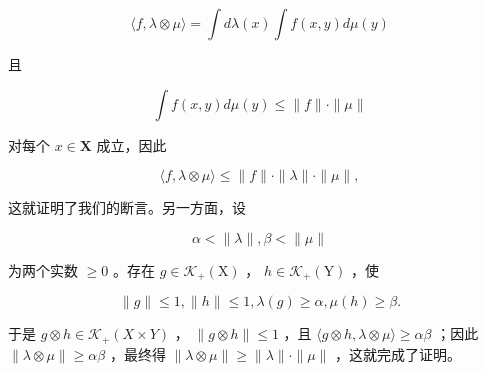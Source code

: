 \[
\langle f, \lambda \otimes \mu \rangle = \int d \lambda (x) \int f (x, y) d \mu (y)
\]

且

\[
\int f (x, y) d \mu (y) \leqslant \| f \| \cdot \| \mu \|
\]

对每个 \(x\in \mathbf{X}\) 成立，因此

\[
\langle f, \lambda \otimes \mu \rangle \leqslant \| f \| \cdot \| \lambda \| \cdot \| \mu \|,
\]

这就证明了我们的断言。另一方面，设

\[
\alpha <   \| \lambda \|, \beta <   \| \mu \|
\]

为两个实数 \(\geqslant 0\) 。存在 \(g\in \mathcal{K}_{+}(\mathrm{X})\) ， \(h\in \mathcal{K}_{+}(\mathrm{Y})\) ，使

\[
\| g \| \leqslant 1, \| h \| \leqslant 1, \lambda (g) \geqslant \alpha , \mu (h) \geqslant \beta .
\]

于是 \(g \otimes h \in \mathcal{K}_{+}(X \times Y)\) ， \(\| g \otimes h \| \leqslant 1\) ，且 \(\langle g \otimes h, \lambda \otimes \mu \rangle \geqslant \alpha \beta\) ；因此 \(\| \lambda \otimes \mu \| \geqslant \alpha \beta\) ，最终得 \(\| \lambda \otimes \mu \| \geqslant \| \lambda \| \cdot \| \mu \|\) ，这就完成了证明。


